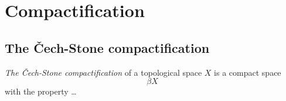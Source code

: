 \chapter{Compactification}

\section{The Čech-Stone compactification}

\begin{framed}
  \begin{df}[$\beta X$]
    \emph{The Čech-Stone compactification\/} of a topological space $X$ is a
    compact space
    \[
      \beta X
    \]
    with the property \ldots
  \end{df}
\end{framed}
